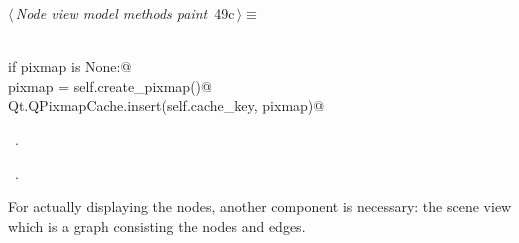 \documentclass[
    a4paper,      %
    10pt,         %
    openright,    %
    notitlepage,  %
    parskip=half, %
]{scrreprt}       %
\theoremstyle{definition}                    %
\begin{document}
\begin{flushleft} \small
\begin{minipage}{\linewidth}\label{scrap71}\raggedright\small
{} $\langle\,${\itshape Node view model methods paint}\nobreak\ {\footnotesize {49c}}$\,\rangle\equiv$
\vspace{-1ex}
\begin{list}{}{} \item
\mbox{}\lstinline@@\\
\mbox{}\lstinline@    if pixmap is None:@\\
\mbox{}\lstinline@        pixmap = self.create_pixmap()@\\
\mbox{}\lstinline@        Qt.QPixmapCache.insert(self.cache_key, pixmap)@\\
\mbox{}\lstinline@@{\NWsep}
\end{list}
\vspace{-1.5ex}
\footnotesize
\begin{list}{}{\setlength{\itemsep}{-\parsep}\setlength{\itemindent}{-\leftmargin}}
\item \NWtxtMacroDefBy\ .
\item \NWtxtMacroRefIn\ .

\item{}
\end{list}
\end{minipage}\vspace{4ex}
\end{flushleft}
For actually displaying the nodes, another component is necessary: the scene
view which is a graph consisting the nodes and edges.
\end{document}
